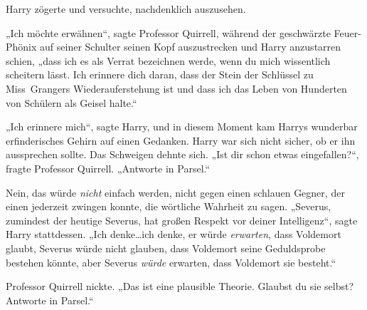 Harry zögerte und versuchte, nachdenklich auszusehen.

„Ich möchte erwähnen“, sagte Professor Quirrell, während der geschwärzte Feuer-Phönix auf seiner Schulter seinen Kopf auszustrecken und Harry anzustarren schien,
„dass ich es als Verrat bezeichnen werde, wenn du mich wissentlich scheitern lässt. Ich erinnere dich daran, dass der Stein der Schlüssel zu Miss~Grangers Wiederauferstehung ist und dass ich das Leben von Hunderten von Schülern als Geisel halte.“

„Ich erinnere mich“, sagte Harry, und in diesem Moment kam Harrys wunderbar erfinderisches Gehirn auf einen Gedanken.
Harry war sich nicht sicher, ob er ihn aussprechen sollte.
Das Schweigen dehnte sich.
„Ist dir schon etwas eingefallen?“, fragte Professor Quirrell. „Antworte in Parsel.“

Nein, das würde \emph{nicht} einfach werden, nicht gegen einen schlauen Gegner, der einen jederzeit zwingen konnte, die wörtliche Wahrheit zu sagen.
„Severus, zumindest der heutige Severus, hat großen Respekt vor deiner Intelligenz“, sagte Harry stattdessen. „Ich denke…ich denke, er würde \emph{erwarten}, dass Voldemort glaubt, Severus würde nicht glauben, dass Voldemort seine Geduldsprobe bestehen könnte, aber Severus \emph{würde} erwarten, dass Voldemort sie besteht.“

Professor Quirrell nickte.
„Das ist eine plausible Theorie. Glaubst du sie selbst? Antworte in Parsel.“

